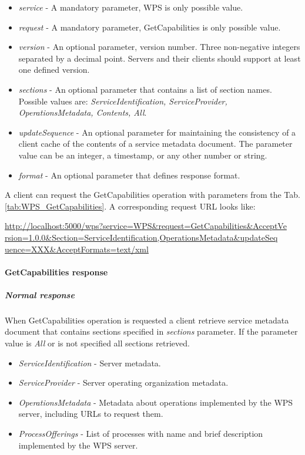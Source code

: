 \begin{itemize}
\item\textit{service} - A mandatory parameter, WPS is only possible value.
\item\textit{request} - A mandatory parameter, GetCapabilities is only possible value.
\item\textit{version} - An optional parameter, version number. Three non-negative integers separated by a decimal point. Servers and
their clients should support at least one defined version.
\item\textit{sections} - An optional parameter that contains a list of section names. Possible values are: \textit{ServiceIdentification,
ServiceProvider, OperationsMetadata, Contents, All}.
\item\textit{updateSequence} - An optional parameter for maintaining the consistency of a client cache of the contents of a service
metadata document. The parameter value can be an integer, a timestamp, or any other number or string.
\item\textit{format} - An optional parameter that defines response format.
\end{itemize}

A client can request the GetCapabilities operation with parameters from the Tab. \ref{tab:WPS_GetCapabilities}. A corresponding
request URL looks like:

\noindent
\url{http://localhost:5000/wps?service=WPS&request=GetCapabilities&AcceptVe}\\
\url{rsion=1.0.0&Section=ServiceIdentification,OperationsMetadata&updateSeq}\\
\url{uence=XXX&AcceptFormats=text/xml}

\paragraph{GetCapabilities response}
\label{para:GetCapa_response}
\subparagraph{Normal response}
When GetCapabilities operation is requested a client retrieve service metadata document that contains sections specified in
\textit{sections} parameter. If the parameter value is \textit{All} or is not specified all sections retrieved.

\begin{itemize}
\item\textit{ServiceIdentification} - Server metadata.
\item\textit{ServiceProvider} - Server operating organization metadata.
\item\textit{OperationsMetadata} - Metadata about operations implemented by the WPS server, including URLs to request them.
\item\textit{ProcessOfferings} - List of processes with name and brief description implemented by the WPS server.
\end{itemize}

